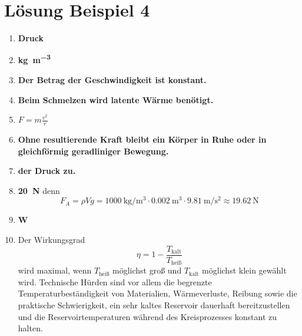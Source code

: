 \documentclass[11pt, a4paper]{article}
\begin{document}
\section*{Lösung Beispiel 4}
\begin{enumerate}
    \item \textbf{Druck}
    \item \textbf{\si{\kilogram\per\metre\cubed}}
    \item \textbf{Der Betrag der Geschwindigkeit ist konstant.}
    \item \textbf{Beim Schmelzen wird latente W\"arme ben\"otigt.}
    \item \textbf{$F = m \frac{v^2}{r}$}
    \item \textbf{Ohne resultierende Kraft bleibt ein K\"orper in Ruhe oder in gleichf\"ormig geradliniger Bewegung.}
    \item \textbf{der Druck zu.}
    \item \textbf{\SI{20}{\newton}} \quad denn
    \[
        F_A = \rho V g = \SI{1000}{\kilogram\per\metre\cubed} \cdot \SI{0.002}{\metre\cubed} \cdot \SI{9.81}{\metre\per\second\squared} \approx \SI{19.62}{\newton}
    \]
    \item \textbf{\si{\watt}}
    \item Der Wirkungsgrad
    \[
        \eta = 1 - \frac{T_{\text{kalt}}}{T_{\text{hei\ss}}}
    \]
    wird maximal, wenn $T_{\text{hei\ss}}$ möglichst groß und $T_{\text{kalt}}$ möglichst klein gewählt wird. Technische Hürden sind vor allem die begrenzte Temperaturbeständigkeit von Materialien, Wärmeverluste, Reibung sowie die praktische Schwierigkeit, ein sehr kaltes Reservoir dauerhaft bereitzustellen und die Reservoirtemperaturen während des Kreisprozesses konstant zu halten.
\end{enumerate}
\end{document}
